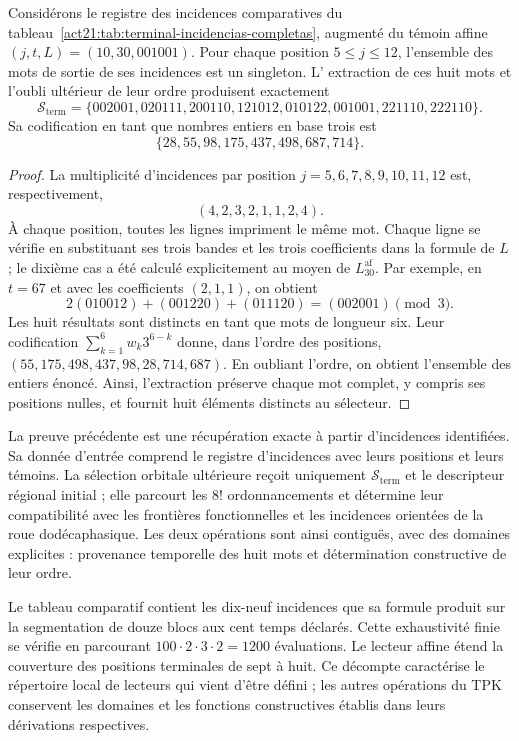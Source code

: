 \begin{proposition}
\label{act21:prop:repertorio-terminal-ocho-incidencias}
Considérons le registre des incidences comparatives du
tableau~\ref{act21:tab:terminal-incidencias-completas}, augmenté du témoin
affine $(j,t,L)=(10,30,001001)$. Pour chaque position $5\leq j\leq12$,
l'ensemble des mots de sortie de ses incidences est un singleton. L'
extraction de ces huit mots et l'oubli ultérieur de leur ordre
produisent exactement
\[
 \mathcal S_{\mathrm{term}}=
 \{002001,020111,200110,121012,010122,001001,221110,222110\}.
\]
Sa codification en tant que nombres entiers en base trois est
\[
 \{28,55,98,175,437,498,687,714\}.
\]
\end{proposition}
\begin{proof}
La multiplicité d'incidences par position $j=5,6,7,8,9,10,11,12$
est, respectivement,
\[
 (4,2,3,2,1,1,2,4).
\]
À chaque position, toutes les lignes impriment le même mot. Chaque ligne se vérifie en substituant ses trois bandes et les trois coefficients dans la formule de $L$ ; le dixième cas a été calculé explicitement au moyen de $L^{\mathrm{af}}_{30}$. Par exemple, en $t=67$ et avec les coefficients $(2,1,1)$, on obtient
\[
 2(010012)+(001220)+(011120)=(002001)\pmod3.
\]
Les huit résultats sont distincts en tant que mots de longueur six. Leur codification $\sum_{k=1}^{6}w_k3^{6-k}$ donne, dans l'ordre des positions, $(55,175,498,437,98,28,714,687)$. En oubliant l'ordre, on obtient l'ensemble des entiers énoncé. Ainsi, l'extraction préserve chaque mot complet, y compris ses positions nulles, et fournit huit éléments distincts au sélecteur.
\end{proof}

La preuve précédente est une récupération exacte à partir d'incidences
identifiées. Sa donnée d'entrée comprend le registre d'incidences
avec leurs positions et leurs témoins. La sélection orbitale ultérieure reçoit
uniquement $\mathcal S_{\mathrm{term}}$ et le descripteur régional initial ;
elle parcourt les $8!$ ordonnancements et détermine leur compatibilité avec les
frontières fonctionnelles et les incidences orientées de la roue
dodécaphasique. Les deux opérations sont ainsi contiguës, avec des domaines
explicites : provenance temporelle des huit mots et détermination
constructive de leur ordre.

Le tableau comparatif contient les dix-neuf incidences que sa formule produit sur la segmentation de douze blocs aux cent temps déclarés. Cette exhaustivité finie se vérifie en parcourant $100\cdot2\cdot3\cdot2=1200$ évaluations. Le lecteur affine étend la couverture des positions terminales de sept à huit. Ce décompte caractérise le répertoire local de lecteurs qui vient d'être défini ; les autres opérations du TPK conservent les domaines et les fonctions constructives établis dans leurs dérivations respectives.

